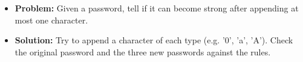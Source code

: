 \begin{frame}
    \frametitle{\problemtitle}
    \begin{itemize}
        \item<+-> \textbf{Problem:} Given a password, tell if it can become strong after appending at most one character.
        \item<+-> \textbf{Solution:} Try to append a character of each type (e.g. '0', 'a', 'A'). Check the original password and the three new passwords against the rules.
    \end{itemize}
\end{frame}
